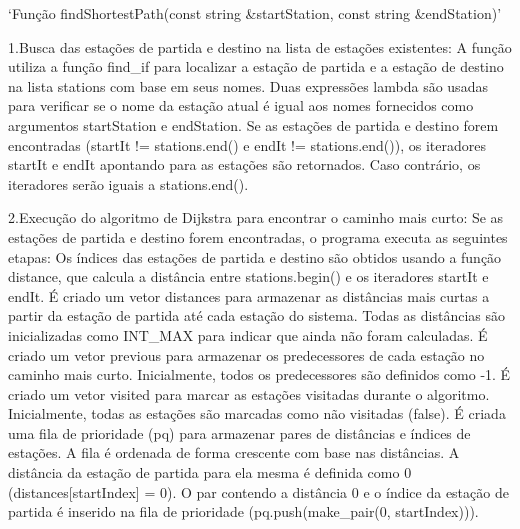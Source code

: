 `Função findShortestPath(const string &startStation, const string &endStation)'

1.Busca das estações de partida e destino na lista de estações existentes:
A função utiliza a função find_if para localizar a estação de partida e a estação de destino na lista stations com base em seus nomes. Duas expressões lambda são usadas para verificar se o nome da estação atual é igual aos nomes fornecidos como argumentos startStation e endStation.
Se as estações de partida e destino forem encontradas (startIt != stations.end() e endIt != stations.end()), os iteradores startIt e endIt apontando para as estações são retornados. Caso contrário, os iteradores serão iguais a stations.end().

2.Execução do algoritmo de Dijkstra para encontrar o caminho mais curto:
Se as estações de partida e destino forem encontradas, o programa executa as seguintes etapas:
Os índices das estações de partida e destino são obtidos usando a função distance, que calcula a distância entre stations.begin() e os iteradores startIt e endIt.
É criado um vetor distances para armazenar as distâncias mais curtas a partir da estação de partida até cada estação do sistema. Todas as distâncias são inicializadas como INT_MAX para indicar que ainda não foram calculadas.
É criado um vetor previous para armazenar os predecessores de cada estação no caminho mais curto. Inicialmente, todos os predecessores são definidos como -1.
É criado um vetor visited para marcar as estações visitadas durante o algoritmo. Inicialmente, todas as estações são marcadas como não visitadas (false).
É criada uma fila de prioridade (pq) para armazenar pares de distâncias e índices de estações. A fila é ordenada de forma crescente com base nas distâncias.
A distância da estação de partida para ela mesma é definida como 0 (distances[startIndex] = 0).
O par contendo a distância 0 e o índice da estação de partida é inserido na fila de prioridade (pq.push(make_pair(0, startIndex))).

